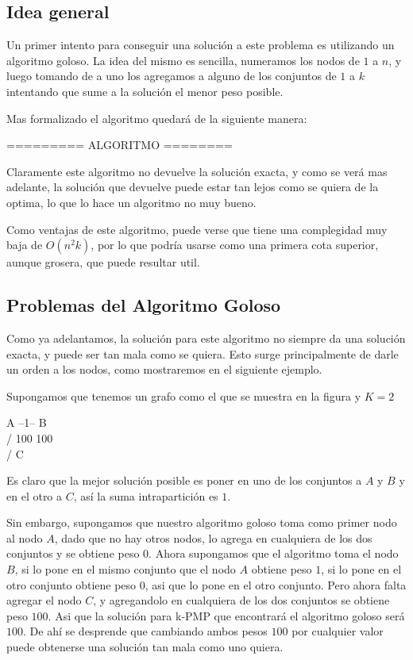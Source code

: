 \subsection{Idea general}

Un primer intento para conseguir una solución a este problema es utilizando un algoritmo goloso. La idea del mismo es sencilla, numeramos los nodos de $1$ a $n$, y luego tomando de a uno los agregamos a alguno de los conjuntos de $1$ a $k$ intentando que sume a la solución el menor peso posible.

Mas formalizado el algoritmo quedará de la siguiente manera:


========= ALGORITMO ========



Claramente este algoritmo no devuelve la solución exacta, y como se verá mas adelante, la solución que devuelve puede estar tan lejos como se quiera de la optima, lo que lo hace un algoritmo no muy bueno.

Como ventajas de este algoritmo, puede verse que tiene una complegidad muy baja de $O(n^2 k)$, por lo que podría usarse como una primera cota superior, aunque grosera, que puede resultar util.


\subsection{Problemas del Algoritmo Goloso}

Como ya adelantamos, la solución para este algoritmo no siempre da una solución exacta, y puede ser tan mala como se quiera. Esto surge principalmente de darle un orden a los nodos, como mostraremos en el siguiente ejemplo.

Supongamos que tenemos un grafo como el que se muestra en la figura y $K = 2$


A --1-- B
 \\    /
 100  100
  \\  /
    C

Es claro que la mejor solución posible es poner en uno de los conjuntos a $A$ y $B$ y en el otro a $C$, así la suma intrapartición es $1$.

Sin embargo, supongamos que nuestro algoritmo goloso toma como primer nodo al nodo $A$, dado que no hay otros nodos, lo agrega en cualquiera de los dos conjuntos y se obtiene peso $0$. Ahora supongamos que el algoritmo toma el nodo $B$, si lo pone en el mismo conjunto que el nodo $A$ obtiene peso $1$, si lo pone en el otro conjunto obtiene peso $0$, asi que lo pone en el otro conjunto. Pero ahora falta agregar el nodo $C$, y agregandolo en cualquiera de los dos conjuntos se obtiene peso $100$. Asi que la solución para k-PMP que encontrará el algoritmo goloso será $100$.
De ahí se desprende que cambiando ambos pesos $100$ por cualquier valor puede obtenerse una solución tan mala como uno quiera.


